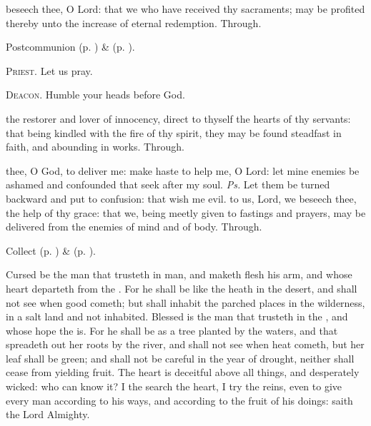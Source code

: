 \postcommunion
{} beseech thee, O Lord: that we who have received thy sacraments; may be profited thereby unto the increase of eternal redemption. Through.


\begin{rubric}
     Postcommunion  (p. \pageref{AshWednesdayMassPostcommunion}) \&   (p. \pageref{SPLivingDeparted}).
\end{rubric}

\textsc{Priest.} Let us pray.\par
\textsc{Deacon.} Humble your heads before God.\par
{} the restorer and lover of innocency, direct to thyself the hearts of thy servants: that being kindled with the fire of thy spirit, they may be found steadfast in faith, and abounding in works. Through.


\clearpage
{}
\introit
{} thee, O God, to deliver me: make haste to help me, O Lord: let mine enemies be ashamed and confounded that seek after my soul. \textit{Ps.} Let them be turned backward and put to confusion: that wish me evil.
\collect
{} to us, Lord, we beseech thee, the help of thy grace: that we, being meetly given to fastings and prayers, may be delivered from the enemies of mind and of body. Through.
\begin{rubric}
     Collect  (p. \pageref{AshWednesdayMassCollect}) \&   (p. \pageref{SPLivingDeparted}).
\end{rubric}

 Cursed be the man that trusteth in man, and maketh flesh his arm, and whose heart departeth from the . For he shall be like the heath in the desert, and shall not see when good cometh; but shall inhabit the parched places in the wilderness, in a salt land and not inhabited. Blessed is the man that trusteth in the , and whose hope the  is. For he shall be as a tree planted by the waters, and that spreadeth out her roots by the river, and shall not see when heat cometh, but her leaf shall be green; and shall not be careful in the year of drought, neither shall cease from yielding fruit. The heart is deceitful above all things, and desperately wicked: who can know it? I the  search the heart, I try the reins, even to give every man according to his ways, and according to the fruit of his doings: saith the Lord Almighty.

